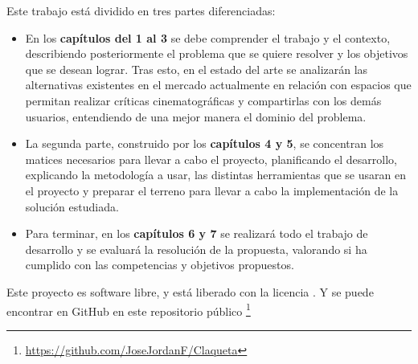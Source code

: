 Este trabajo está dividido en tres partes diferenciadas:
\begin{itemize}
    \item En los \textbf{capítulos del 1 al 3} se debe comprender el trabajo y el contexto, describiendo 
    posteriormente el problema que se quiere resolver y los objetivos que se desean lograr. Tras esto, 
    en el estado del arte se analizarán las alternativas existentes en el mercado actualmente en 
    relación con espacios que permitan realizar críticas cinematográficas y compartirlas con los demás 
    usuarios, entendiendo de una mejor manera el dominio del problema.
    \item La segunda parte, construido por los \textbf{capítulos 4 y 5}, se concentran los matices 
    necesarios para llevar a cabo el proyecto, planificando el desarrollo, explicando la metodología a 
    usar, las distintas herramientas que se usaran en el proyecto y preparar el terreno para llevar a 
    cabo la implementación de la solución estudiada.
    \item Para terminar, en los \textbf{capítulos 6 y 7} se realizará todo el trabajo de desarrollo y se 
    evaluará la resolución de la propuesta, valorando si ha cumplido con las competencias y objetivos 
    propuestos.
\end{itemize}

Este proyecto es software libre, y está liberado con la licencia \cite{gplv3}. Y se puede encontrar en 
GitHub en este repositorio público \footnote{\url{https://github.com/JoseJordanF/Claqueta}}